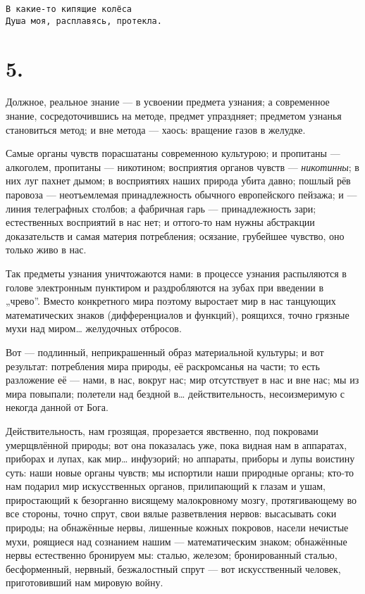 \documentclass[12pt,a4paper,oneside]{book}
\begin{document}
\begin{Verbatim}
В какие-то кипящие колёса
Душа моя, расплавясь, протекла.
\end{Verbatim}

\section*{5.}

Должное, реальное знание — в усвоении предмета узнания; а современное знание, сосредоточившись на методе, предмет упраздняет; предметом узнанья становиться метод; и вне метода — хаось: вращение газов в желудке.

Самые органы чувств порасшатаны современною культурою; и пропитаны — алкоголем, пропитаны — никотином; восприятия органов чувств — \emph{никотинны}; в них луг пахнет дымом; в восприятиях наших природа убита давно; пошлый рёв паровоза — неотъемлемая принадлежность обычного европейского пейзажа; и — линия телеграфных столбов; а фабричная гарь — принадлежность зари; естественных восприятий в нас нет; и оттого-то нам нужны абстракции доказательств и самая материя потребления; осязание, грубейшее чувство, оно только живо в нас.

Так предметы узнания уничтожаются нами: в процессе узнания распыляются в голове электронным пунктиром и раздробляются на зубах при введении в „чрево”. Вместо конкретного мира поэтому выростает мир в нас танцующих математических знаков (дифференциалов и функций), роящихся, точно грязные мухи над миром… желудочных отбросов.

Вот — подлинный, неприкрашенный образ материальной культуры; и вот результат: потребления мира природы, её раскромсанья на части; то есть разложение её — нами, в нас, вокруг нас; мир отсутствует в нас и вне нас; мы из мира повыпали; полетели над бездной в… действительность, несоизмеримую с некогда данной от Бога.

Действительность, нам грозящая, прорезается явственно, под покровами умерщвлённой природы; вот она показалась уже, пока видная нам в аппаратах, приборах и лупах, как мир… инфузорий; но аппараты, приборы и лупы воистину суть: наши новые органы чувств; мы испортили наши природные органы; кто-то нам подарил мир искусственных органов, прилипающий к глазам и ушам, приростающий к безорганно висящему малокровному мозгу, протягивающему во все стороны, точно спрут, свои вялые разветвления нервов: высасывать соки природы; на обнажённые нервы, лишенные кожных покровов, насели нечистые мухи, роящиеся над сознанием нашим — математическим знаком; обнажённые нервы естественно бронируем мы: сталью, железом; бронированный сталью, бесформенный, нервный, безжалостный спрут — вот искусственный человек, приготовивший нам мировую войну.
\end{document}
